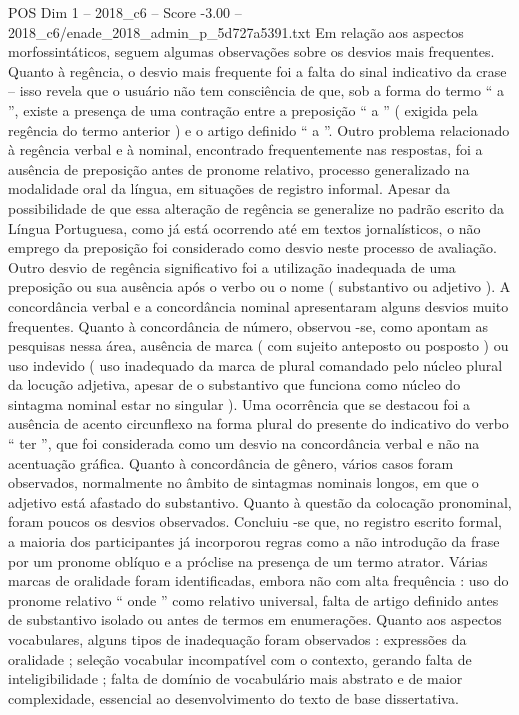 \begin{textsample}{POS Dim 1 – 2018\_c6 – Score -3.00 – 2018\_c6/enade\_2018\_admin\_p\_5d727a5391.txt}
Em relação aos aspectos morfossintáticos, seguem algumas observações sobre os desvios mais frequentes.
Quanto à regência, o desvio mais frequente foi a falta do sinal indicativo da crase – isso revela que o usuário não tem consciência de que, sob a forma do termo “ a ”, existe a presença de uma contração entre a preposição “ a ” ( exigida pela regência do termo anterior ) e o artigo definido “ a ”.
Outro problema relacionado à regência verbal e à nominal, encontrado frequentemente nas respostas, foi a ausência de preposição antes de pronome relativo, processo generalizado na modalidade oral da língua, em situações de registro informal.
Apesar da possibilidade de que essa alteração de regência se generalize no padrão escrito da Língua Portuguesa, como já está ocorrendo até em textos jornalísticos, o não emprego da preposição foi considerado como desvio neste processo de avaliação.
Outro desvio de regência significativo foi a utilização inadequada de uma preposição ou sua ausência após o verbo ou o nome ( substantivo ou adjetivo ).
A concordância verbal e a concordância nominal apresentaram alguns desvios muito frequentes.
Quanto à concordância de número, observou -se, como apontam as pesquisas nessa área, ausência de marca ( com sujeito anteposto ou posposto ) ou uso indevido ( uso inadequado da marca de plural comandado pelo núcleo plural da locução adjetiva, apesar de o substantivo que funciona como núcleo do sintagma nominal estar no singular ).
Uma ocorrência que se destacou foi a ausência de acento circunflexo na forma plural do presente do indicativo do verbo “ ter ”, que foi considerada como um desvio na concordância verbal e não na acentuação gráfica.
Quanto à concordância de gênero, vários casos foram observados, normalmente no âmbito de sintagmas nominais longos, em que o adjetivo está afastado do substantivo.
Quanto à questão da colocação pronominal, foram poucos os desvios observados.
Concluiu -se que, no registro escrito formal, a maioria dos participantes já incorporou regras como a não introdução da frase por um pronome oblíquo e a próclise na presença de um termo atrator.
Várias marcas de oralidade foram identificadas, embora não com alta frequência : uso do pronome relativo “ onde ” como relativo universal, falta de artigo definido antes de substantivo isolado ou antes de termos em enumerações.
Quanto aos aspectos vocabulares, alguns tipos de inadequação foram observados : expressões da oralidade ; seleção vocabular incompatível com o contexto, gerando falta de inteligibilidade ; falta de domínio de vocabulário mais abstrato e de maior complexidade, essencial ao desenvolvimento do texto de base dissertativa.

\end{textsample}
